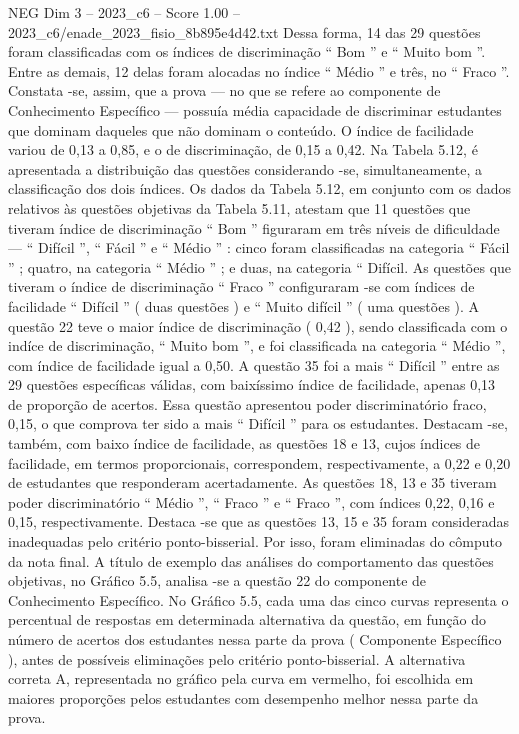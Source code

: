 \begin{textsample}{NEG Dim 3 – 2023\_c6 – Score 1.00 – 2023\_c6/enade\_2023\_fisio\_8b895e4d42.txt}
Dessa forma, 14 das 29 questões foram classificadas com os índices de discriminação “ Bom ” e “ Muito bom ”.
Entre as demais, 12 delas foram alocadas no índice “ Médio ” e três, no “ Fraco ”.
Constata -se, assim, que a prova — no que se refere ao componente de Conhecimento Específico — possuía média capacidade de discriminar estudantes que dominam daqueles que não dominam o conteúdo.
O índice de facilidade variou de 0,13 a 0,85, e o de discriminação, de 0,15 a 0,42.
Na Tabela 5.12, é apresentada a distribuição das questões considerando -se, simultaneamente, a classificação dos dois índices.
Os dados da Tabela 5.12, em conjunto com os dados relativos às questões objetivas da Tabela 5.11, atestam que 11 questões que tiveram índice de discriminação “ Bom ” figuraram em três níveis de dificuldade — “ Difícil ”, “ Fácil ” e “ Médio ” : cinco foram classificadas na categoria “ Fácil ” ; quatro, na categoria “ Médio ” ; e duas, na categoria “ Difícil.
As questões que tiveram o índice de discriminação “ Fraco ” configuraram -se com índices de facilidade “ Difícil ” ( duas questões ) e “ Muito difícil ” ( uma questões ).
A questão 22 teve o maior índice de discriminação ( 0,42 ), sendo classificada com o indíce de discriminação, “ Muito bom ”, e foi classificada na categoria “ Médio ”, com índice de facilidade igual a 0,50.
A questão 35 foi a mais “ Difícil ” entre as 29 questões específicas válidas, com baixíssimo índice de facilidade, apenas 0,13 de proporção de acertos.
Essa questão apresentou poder discriminatório fraco, 0,15, o que comprova ter sido a mais “ Difícil ” para os estudantes.
Destacam -se, também, com baixo índice de facilidade, as questões 18 e 13, cujos índices de facilidade, em termos proporcionais, correspondem, respectivamente, a 0,22 e 0,20 de estudantes que responderam acertadamente.
As questões 18, 13 e 35 tiveram poder discriminatório “ Médio ”, “ Fraco ” e “ Fraco ”, com índices 0,22, 0,16 e 0,15, respectivamente.
Destaca -se que as questões 13, 15 e 35 foram consideradas inadequadas pelo critério ponto-bisserial.
Por isso, foram eliminadas do cômputo da nota final.
A título de exemplo das análises do comportamento das questões objetivas, no Gráfico 5.5, analisa -se a questão 22 do componente de Conhecimento Específico.
No Gráfico 5.5, cada uma das cinco curvas representa o percentual de respostas em determinada alternativa da questão, em função do número de acertos dos estudantes nessa parte da prova ( Componente Específico ), antes de possíveis eliminações pelo critério ponto-bisserial.
A alternativa correta A, representada no gráfico pela curva em vermelho, foi escolhida em maiores proporções pelos estudantes com desempenho melhor nessa parte da prova.

\end{textsample}
